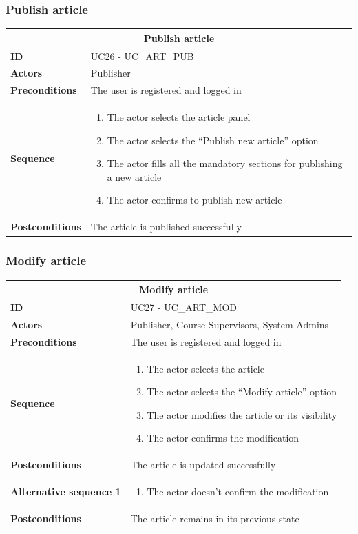 \subsubsection{Publish article}
\begin{tabular}{|m{2.5cm}|m{8cm}|}
	\hline
	\multicolumn{2}{|c|}{Publish article} \\
	\hline
	\textbf{ID} & UC26 - UC\_ART\_PUB \\
	\hline
	\textbf{Actors} & Publisher \\
	\hline
	\textbf{Preconditions} & The user is registered and logged in \\
	\hline
	\textbf{Sequence} & 
	\begin{enumerate}
		\item The actor selects the article panel
		\item The actor selects the “Publish new article” option
		\item The actor fills all the mandatory sections for publishing a new article
		\item The actor confirms to publish new article
	\end{enumerate} \\
	\hline
	\textbf{Postconditions} & The article is published successfully \\
	\hline
\end{tabular}

\subsubsection{Modify article}
\begin{tabular}{|m{2.5cm}|m{8cm}|}
	\hline
	\multicolumn{2}{|c|}{Modify article} \\
	\hline
	\textbf{ID} & UC27 - UC\_ART\_MOD \\
	\hline
	\textbf{Actors} & Publisher, Course Supervisors, System Admins \\
	\hline
	\textbf{Preconditions} & The user is registered and logged in \\
	\hline
	\textbf{Sequence} & 
	\begin{enumerate}
		\item The actor selects the article
		\item The actor selects the “Modify article” option
		\item The actor modifies the article or its visibility
		\item The actor confirms the modification
	\end{enumerate} \\
	\hline
	\textbf{Postconditions} & The article is updated successfully \\
	\hline
	
	\textbf{Alternative sequence 1} & 
	\begin{enumerate}
		\item The actor doesn’t confirm the modification
	\end{enumerate} \\
	\hline
	\textbf{Postconditions} & The article remains in its previous state \\
	\hline
\end{tabular}

